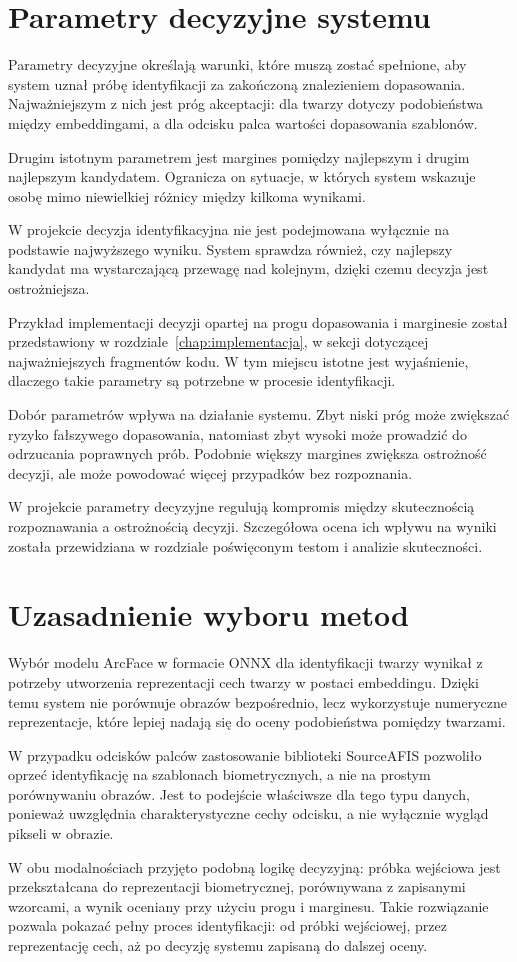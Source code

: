 \section{Parametry decyzyjne systemu}

Parametry decyzyjne określają warunki, które muszą zostać spełnione, aby system uznał próbę identyfikacji za zakończoną znalezieniem dopasowania. Najważniejszym z nich jest próg akceptacji: dla twarzy dotyczy podobieństwa między embeddingami, a dla odcisku palca wartości dopasowania szablonów.

Drugim istotnym parametrem jest margines pomiędzy najlepszym i drugim najlepszym kandydatem. Ogranicza on sytuacje, w których system wskazuje osobę mimo niewielkiej różnicy między kilkoma wynikami.

W projekcie decyzja identyfikacyjna nie jest podejmowana wyłącznie na podstawie najwyższego wyniku. System sprawdza również, czy najlepszy kandydat ma wystarczającą przewagę nad kolejnym, dzięki czemu decyzja jest ostrożniejsza.

Przykład implementacji decyzji opartej na progu dopasowania i marginesie został przedstawiony w rozdziale~\ref{chap:implementacja}, w sekcji dotyczącej najważniejszych fragmentów kodu. W tym miejscu istotne jest wyjaśnienie, dlaczego takie parametry są potrzebne w procesie identyfikacji.

Dobór parametrów wpływa na działanie systemu. Zbyt niski próg może zwiększać ryzyko fałszywego dopasowania, natomiast zbyt wysoki może prowadzić do odrzucania poprawnych prób. Podobnie większy margines zwiększa ostrożność decyzji, ale może powodować więcej przypadków bez rozpoznania.

W projekcie parametry decyzyjne regulują kompromis między skutecznością rozpoznawania a ostrożnością decyzji. Szczegółowa ocena ich wpływu na wyniki została przewidziana w rozdziale poświęconym testom i analizie skuteczności.

\section{Uzasadnienie wyboru metod}

Wybór modelu ArcFace w formacie ONNX dla identyfikacji twarzy wynikał z potrzeby utworzenia reprezentacji cech twarzy w postaci embeddingu. Dzięki temu system nie porównuje obrazów bezpośrednio, lecz wykorzystuje numeryczne reprezentacje, które lepiej nadają się do oceny podobieństwa pomiędzy twarzami.

W przypadku odcisków palców zastosowanie biblioteki SourceAFIS pozwoliło oprzeć identyfikację na szablonach biometrycznych, a nie na prostym porównywaniu obrazów. Jest to podejście właściwsze dla tego typu danych, ponieważ uwzględnia charakterystyczne cechy odcisku, a nie wyłącznie wygląd pikseli w obrazie.

W obu modalnościach przyjęto podobną logikę decyzyjną: próbka wejściowa jest przekształcana do reprezentacji biometrycznej, porównywana z zapisanymi wzorcami, a wynik oceniany przy użyciu progu i marginesu. Takie rozwiązanie pozwala pokazać pełny proces identyfikacji: od próbki wejściowej, przez reprezentację cech, aż po decyzję systemu zapisaną do dalszej oceny.